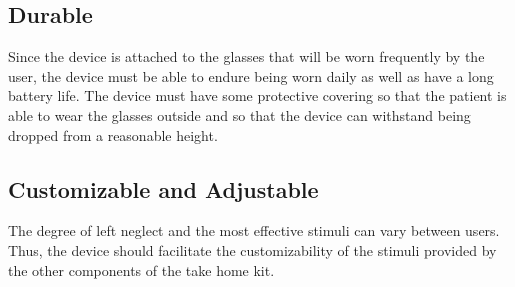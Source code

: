 \subsection{Durable}

Since the device is attached to the glasses that will be worn frequently by the
user, the device must be able to endure being worn daily as well as have a long
battery life. The device must have some protective covering so that the patient
is able to wear the glasses outside and so that the device can withstand being
dropped from a reasonable height.

\subsection{Customizable and Adjustable}

The degree of left neglect and the most effective stimuli can vary between
users. Thus, the device should facilitate the customizability of the stimuli
provided by the other components of the take home kit. 

